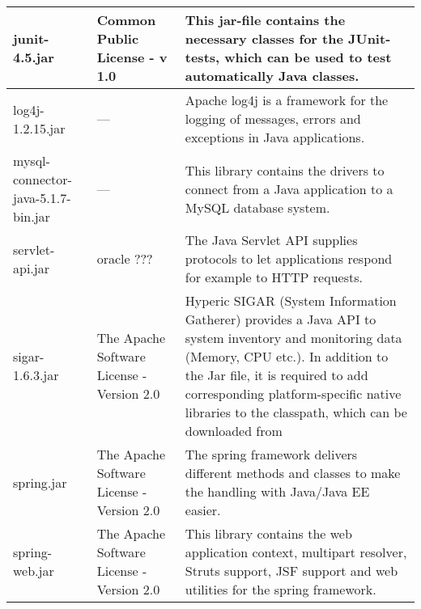 \begin{center}
\begin{longtable}{|p{}|p{}|p{}|}
\hline 
junit-4.5.jar & Common Public License - v 1.0 & This jar-file contains the necessary classes for the JUnit-tests, which can be used to test automatically Java classes.\\
\hline 
log4j-1.2.15.jar &  ---  & Apache log4j is a framework for the logging of messages, errors and exceptions in Java applications.\\
\hline 
mysql-connector-java-5.1.7-bin.jar &  ---  & This library contains the drivers to connect from a Java application to a MySQL database system.\\
\hline 
servlet-api.jar & oracle ??? & The Java Servlet API supplies protocols to let applications respond for example to HTTP requests.\\
\hline 
sigar-1.6.3.jar & The Apache Software License - Version 2.0 & Hyperic SIGAR (System Information Gatherer) provides a Java API to system inventory and monitoring data (Memory, CPU etc.). In addition to the Jar file, it is required to add corresponding platform-specific native libraries to the classpath, which can be downloaded from~\\
\hline 
spring.jar & The Apache Software License - Version 2.0 & The spring framework delivers different methods and classes to make the handling with Java/Java EE easier.\\
\hline 
spring-web.jar & The Apache Software License - Version 2.0 & This library contains the web application context, multipart resolver, Struts support, JSF support and web utilities for the spring framework.\\
\hline 
\end{longtable}
\label{tabular:libraries}
\end{center}
